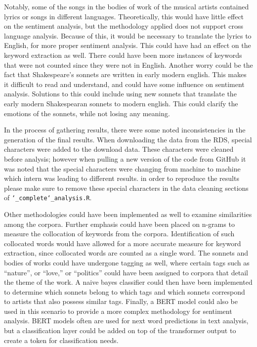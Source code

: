 \documentclass[10pt,a4paper]{article}
\begin{document}
\noindent Notably, some of the songs in the bodies of work of the musical artists contained lyrics or songs in different languages. Theoretically, this would have little effect on the sentiment analysis, but the methodology applied does not support cross language analysis. Because of this, it would be necessary to translate the lyrics to English, for more proper sentiment analysis. This could have had an effect on the keyword extraction as well. There could have been more instances of keywords that were not counted since they were not in English. Another worry could be the fact that Shakespeare’s sonnets are written in early modern english. This makes it difficult to read and understand, and could have some influence on sentiment analysis. Solutions to this could include using new sonnets that translate the early modern Shakespearan sonnets to modern english. This could clarify the emotions of the sonnets, while not losing any meaning. 

\noindent In the process of gathering results, there were some noted inconsistencies in the generation of the final results. When downloading the data from the RDS, special characters were added to the download data. These characters were cleaned before analysis; however when pulling a new version of the code from GitHub it was noted that the special characters were changing from machine to machine which intern was leading to different results. in order to reproduce the results please make sure to remove these special characters in the data cleaning sections of \texttt{\char`_complete\char`_analysis.R}.

\noindent Other methodologies could have been implemented as well to examine similarities among the corpora. Further emphasis could have been placed on n-grams to measure the collocation of keywords from the corpora. Identification of such collocated words would have allowed for a more accurate measure for keyword extraction, since collocated words are counted as a single word. The sonnets and bodies of works could have undergone tagging as well, where certain tags such as “nature”, or “love,” or “politics” could have been assigned to corpora that detail the theme of the work. A naive bayes classifier could then have been implemented to determine which sonnets belong to which tags and which sonnets correspond to artists that also possess similar tags. Finally, a BERT model could also be used in this scenario to provide a more complex methodology for sentiment analysis. BERT models often are used for next word predictions in text analysis, but a classification layer could be added on top of the transformer output to create a token for classification needs. 
\end{document}
